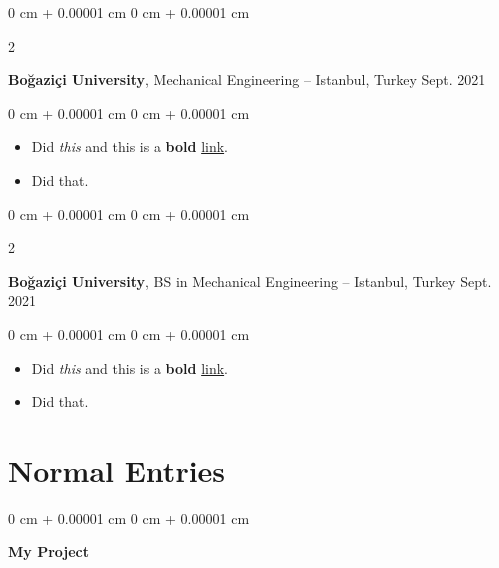 \documentclass[10pt, letterpaper]{article}
\newenvironment{highlights}{
    \begin{itemize}[
        topsep=0.10 cm,
        parsep=0.10 cm,
        partopsep=0pt,
        itemsep=0pt,
        leftmargin=0 cm + 10pt
    ]
}{
    \end{itemize}
} %
\newenvironment{onecolentry}{
    \begin{adjustwidth}{
        0 cm + 0.00001 cm
    }{
        0 cm + 0.00001 cm
    }
}{
    \end{adjustwidth}
} %
\newenvironment{twocolentry}[2][]{
    \onecolentry
    \def\secondColumn{#2}
    \setcolumnwidth{\fill, 4.5 cm}
    \begin{paracol}{2}
}{
    \switchcolumn \raggedleft \secondColumn
    \end{paracol}
    \endonecolentry
} %
\begin{document}
        \vspace{0.2 cm}

        \begin{twocolentry}{
            Sept. 2021
        }
            \textbf{Boğaziçi University}, Mechanical Engineering -- Istanbul, Turkey\end{twocolentry}

        \vspace{0.10 cm}
        \begin{onecolentry}
            \begin{highlights}
                \item Did \textit{this} and this is a \textbf{bold} \href{https://example.com}{link}.
                \item Did that.
            \end{highlights}
        \end{onecolentry}


        \vspace{0.2 cm}

        \begin{twocolentry}{
            Sept. 2021
        }
            \textbf{Boğaziçi University}, BS in Mechanical Engineering -- Istanbul, Turkey\end{twocolentry}

        \vspace{0.10 cm}
        \begin{onecolentry}
            \begin{highlights}
                \item Did \textit{this} and this is a \textbf{bold} \href{https://example.com}{link}.
                \item Did that.
            \end{highlights}
        \end{onecolentry}



    
    \section{Normal Entries}

        
        \begin{onecolentry}
            \textbf{My Project}\end{onecolentry}



        \vspace{0.2 cm}
\end{document}
